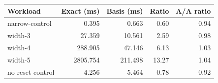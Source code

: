 \begin{tabular}{lrrrr}
\toprule
Workload & Exact (ms) & Basis (ms) & Ratio & A/A ratio\\
\midrule
narrow-control & 0.395 & 0.663 & 0.60 & 0.94\\
width-3 & 27.359 & 10.561 & 2.59 & 0.98\\
width-4 & 288.905 & 47.146 & 6.13 & 1.03\\
width-5 & 2805.754 & 211.498 & 13.27 & 1.04\\
no-reset-control & 4.256 & 5.464 & 0.78 & 0.92\\
\bottomrule
\end{tabular}
